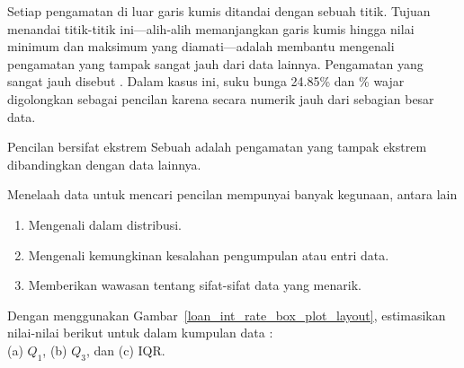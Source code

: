 Setiap pengamatan di luar garis kumis ditandai dengan sebuah titik.
Tujuan menandai titik-titik ini---alih-alih memanjangkan garis
kumis hingga nilai minimum dan maksimum yang diamati---adalah
membantu mengenali pengamatan yang tampak sangat jauh dari data
lainnya. Pengamatan yang sangat jauh disebut
.
Dalam kasus ini, suku bunga 24.85\% dan \loanLargestValue{}\%
wajar digolongkan sebagai pencilan karena secara numerik jauh dari
sebagian besar data.

\begin{onebox}{Pencilan bersifat ekstrem}
  Sebuah  adalah pengamatan yang tampak ekstrem
  dibandingkan dengan data lainnya. \vspace{3mm}
  
  Menelaah data untuk mencari pencilan mempunyai banyak kegunaan,
  antara lain\vspace{-1mm}
  \begin{enumerate}
  \setlength{\itemsep}{0mm}
  \item Mengenali
      dalam distribusi.
  \item Mengenali kemungkinan kesalahan pengumpulan atau
      entri data.
  \item Memberikan wawasan tentang sifat-sifat data yang
      menarik.\vspace{-1mm}
  \end{enumerate}
\end{onebox}


\begin{exercisewrap}
\begin{nexercise}
Dengan menggunakan Gambar~\ref{loan_int_rate_box_plot_layout},
estimasikan nilai-nilai berikut untuk
 dalam kumpulan data : \\
(a) $Q_1$,
(b) $Q_3$, dan
(c) IQR.\footnotemark{}
\end{nexercise}
\end{exercisewrap}


